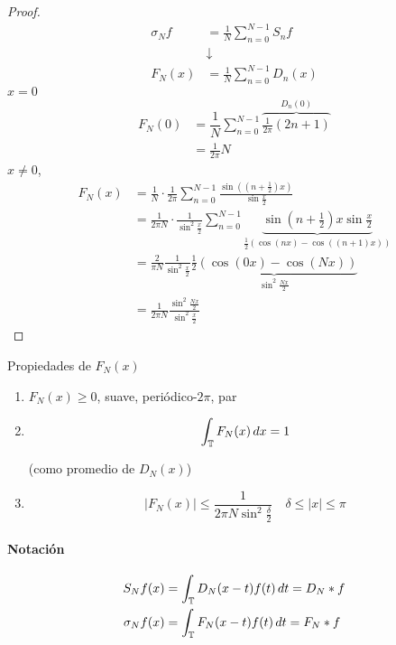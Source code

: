 \begin{proof}
    \begin{align*}
        \sigma_N f&=\frac{1}{N} \sum_{n=0}^{N-1} S_n f\\
        &\downarrow\\
        F_N(x)&=\frac{1}{N}\sum_{n=0}^{N-1} D_n(x)
    \end{align*}
    $x=0$
    \begin{align*}
        F_N(0)&=\dfrac{1}{N}\displaystyle\sum_{n=0}^{N-1} \overbrace{\frac{1}{2\pi} (2n+1)}^{D_n(0)}\\
        &=\frac{1}{2\pi} N
    \end{align*}
    $x\neq 0$,
    \begin{align*}
        F_N(x)&=\frac{1}{N}\cdot \frac{1}{2\pi} \sum_{n=0}^{N-1} \frac{\sin ((n+\frac{1}{2})x)}{\sin\frac{x}{2}}\\
        &=\frac{1}{2\pi N}\cdot \frac{1}{\sin^2 \frac{x}{2}}\sum_{n=0}^{N-1} \underbrace{\sin(n+\frac{1}{2})x\sin \frac{x}{2}}_{\frac{1}{2}\left(\cos(nx)-\cos((n+1)x)\right)}\\
        &=\frac{2}{\pi N}\frac{1}{\sin^2 \frac{x}{2}}\underbrace{\frac{1}{2}(\cos(0x)-\cos(Nx))}_{\sin^2 \frac{Nx}{2}}\\
        &=\frac{1}{2\pi N}\frac{\sin^2 \frac{Nx}{2}}{\sin^2\frac{x}{2}}
    \end{align*}
\end{proof}

Propiedades de $F_N(x)$

\begin{enumerate}
    \item $F_N(x)\geq 0$, suave, periódico-$2\pi$, par 
    \item \[\int_{\mathbb{T}} F_N(x)\,dx=1\]
    
    (como promedio de $D_N(x)$)

    \item \[|F_N(x)|\leq \frac{1}{2\pi N\sin^2 \frac{\delta}{2}}\quad \delta\leq |x|\leq \pi\]
\end{enumerate}


\paragraph{Notación}

\begin{align*}
    S_N f(x)&=\int_{\mathbb{T}} D_N(x-t)f(t)\,dt=D_N*f\\
    \sigma_N f(x)&=\int_{\mathbb{T}} F_N(x-t)f(t)\,dt=F_N*f
\end{align*}

